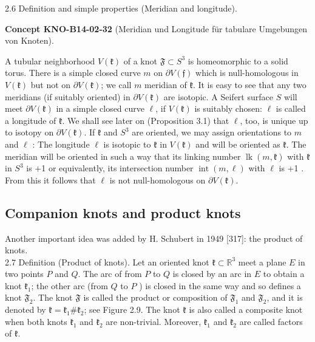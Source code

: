 \documentclass[10pt, letterpaper]{article}
\newcommand{\CustomHeading}[3]{%
  \par\medskip\noindent%
  \textbf{#1 #2} \textnormal{(#3)}.\enskip%
}
\newenvironment{CONC}[2]{\begin{unitbox}\CustomHeading{Concept}{#1}{#2}}{\end{unitbox}}
\begin{document}
2.6 Definition and simple properties (Meridian and longitude). 

\begin{CONC}{KNO-B14-02-32}{Meridian und Longitude für tabulare Umgebungen von Knoten}
A tubular neighborhood $V(\mathfrak{k})$ of a knot $\mathfrak{F} \subset S^{3}$ is homeomorphic to a solid torus. There is a simple closed curve $m$ on $\partial V(\mathfrak{f})$ which is null-homologous in $V(\mathfrak{k})$ but not on $\partial V(\mathfrak{k})$; we call $m$ meridian of $\mathfrak{k}$. It is easy to see that any two meridians (if suitably oriented) in $\partial V(\mathfrak{k})$ are isotopic. A Seifert surface $S$ will meet $\partial V(\mathfrak{k})$ in a simple closed curve $\ell$, if $V(\mathfrak{k})$ is suitably chosen: $\ell$ is called a longitude of $\mathfrak{k}$. We shall see later on (Proposition 3.1) that $\ell$, too, is unique up to isotopy on $\partial V(\mathfrak{k})$. If $\mathfrak{k}$ and $S^{3}$ are oriented, we may assign orientations to $m$ and $\ell$ : The longitude $\ell$ is isotopic to $\mathfrak{k}$ in $V(\mathfrak{k})$ and will be oriented as $\mathfrak{k}$. The meridian will be oriented in such a way that its linking number $\operatorname{lk}(m, \mathfrak{k})$ with $\mathfrak{k}$ in $S^{3}$ is +1 or equivalently, its intersection number $\operatorname{int}(m, \ell)$ with $\ell$ is +1 . From this it follows that $\ell$ is not null-homologous on $\partial V(\mathfrak{k})$.
\end{CONC}


\subsection{Companion knots and product knots}
Another important idea was added by H. Schubert in 1949 [317]: the product of knots.\\
2.7 Definition (Product of knots). Let an oriented knot $\mathfrak{k} \subset \mathbb{R}^{3}$ meet a plane $E$ in two points $P$ and $Q$. The arc of from $P$ to $Q$ is closed by an arc in $E$ to obtain a knot $\mathfrak{k}_{1}$; the other arc (from $Q$ to $P$ ) is closed in the same way and so defines a knot $\mathfrak{F}_{2}$. The knot $\mathfrak{F}$ is called the product or composition of $\mathfrak{F}_{1}$ and $\mathfrak{F}_{2}$, and it is denoted by $\mathfrak{k}=\mathfrak{k}_{1} \# \mathfrak{k}_{2}$; see Figure 2.9. The knot $\mathfrak{k}$ is also called a composite knot when both knots $\mathfrak{k}_{1}$ and $\mathfrak{k}_{2}$ are non-trivial. Moreover, $\mathfrak{k}_{1}$ and $\mathfrak{k}_{2}$ are called factors of $\mathfrak{k}$.
\end{document}
